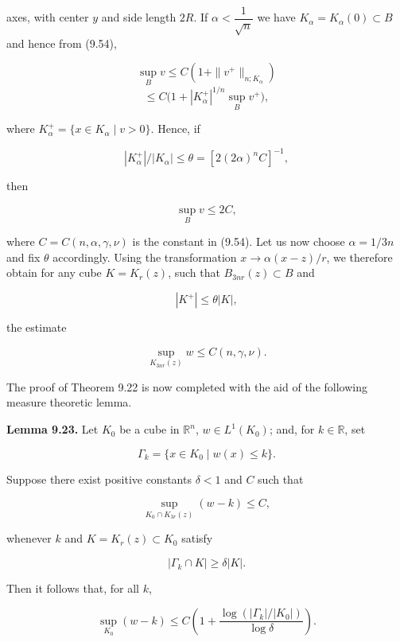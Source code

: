 \noindent axes, with center $y$ and side length $2R$. If $\alpha<\dfrac{1}{\sqrt n}$ we have $K_\alpha=K_\alpha(0)\subset B$ and
hence from (9.54),

\[
\sup_B v \le C(1+\|v^+\|_{n;K_\alpha})
\]
\[
\le C\bigl(1+|K_\alpha^+|^{1/n}\sup_B v^+\bigr),
\]

\noindent where $K_\alpha^+ = \{x\in K_\alpha\mid v>0\}$. Hence, if

\[
|K_\alpha^+|/|K_\alpha|\le \theta = [2(2\alpha)^n C]^{-1},
\]

\noindent then

\[
\sup_B v\le 2C,
\]

\noindent where $C=C(n,\alpha,\gamma,\nu)$ is the constant in (9.54). Let us now choose $\alpha=1/3n$ and
fix $\theta$ accordingly. Using the transformation $x\to\alpha(x-z)/r$, we therefore obtain for
any cube $K=K_r(z)$, such that $B_{3nr}(z)\subset B$ and

\begin{equation}\tag{9.55}
|K^+|\le \theta|K|,
\end{equation}

\noindent the estimate

\begin{equation}\tag{9.56}
\sup_{K_{3nr}(z)} w \le C(n,\gamma,\nu).
\end{equation}

\noindent The proof of Theorem 9.22 is now completed with the aid of the following
measure theoretic lemma.

\medskip

\noindent\textbf{Lemma 9.23.}
Let $K_0$ be a cube in $\mathbb{R}^n$, $w\in L^1(K_0)$; and, for $k\in\mathbb{R}$, set

\[
\Gamma_k=\{x\in K_0\mid w(x)\le k\}.
\]

\noindent Suppose there exist positive constants $\delta<1$ and $C$ such that

\begin{equation}\tag{9.57}
\sup_{K_0\cap K_{3r}(z)} (w-k)\le C,
\end{equation}

\noindent whenever $k$ and $K=K_r(z)\subset K_0$ satisfy

\begin{equation}\tag{9.58}
|\Gamma_k\cap K|\ge \delta|K|.
\end{equation}

\noindent Then it follows that, for all $k$,

\begin{equation}\tag{9.59}
\sup_{K_0}(w-k)\le C\left(1+\frac{\log(|\Gamma_k|/|K_0|)}{\log\delta}\right).
\end{equation}


